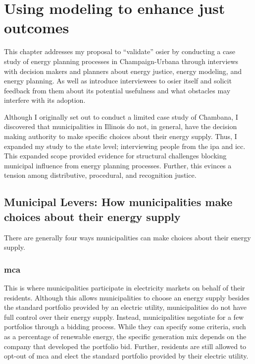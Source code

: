 



\chapter{Using modeling to enhance just outcomes}
\iffalse


This chapter addresses my proposal to ``validate'' \ac{osier} by conducting a
case study of energy planning processes in Champaign-Urbana through interviews
with decision makers and planners about energy justice, energy modeling, and
energy planning. As well as introduce interviewees to \ac{osier} itself and
solicit feedback from them about its potential usefulness and what obstacles may
interfere with its adoption. 

Although I originally set out to conduct a limited case study of Chambana, I
discovered that municipalities in Illinois do not, in general, have the decision
making authority to make specific choices about their energy supply. Thus, I
expanded my study to the state level; interviewing people from the \ac{ipa} and
\ac{icc}. This expanded scope provided evidence for structural challenges
blocking municipal influence from energy planning processes. Further, this
evinces a tension among distributive, procedural, and recognition justice.

\section{Municipal Levers: How municipalities make choices about their energy supply}
There are generally four ways municipalities can make choices about their energy
supply.

\subsection{\ac{mca}} This is where municipalities participate in electricity
markets on behalf of their residents. Although this allows municipalities to
choose an energy supply besides the standard portfolio provided by an electric
utility, municipalities do not have full control over their energy supply.
Instead, municipalities negotiate for a few portfolios through a bidding
process. While they can specify some criteria, such as a percentage of renewable
energy, the specific generation mix depends on the company that developed the
portfolio bid. Further, residents are still allowed to opt-out of \ac{mca} and
elect the standard portfolio provided by their electric utility.

